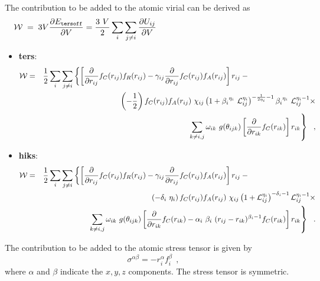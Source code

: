 The contribution to be added to the atomic virial can be derived
as
\begin{equation}
{\cal W} \; = \; 3V \frac{\partial E_{\tt tersoff}}{\partial V} =
\frac{3~V}{2} \sum_{i} \sum_{j \neq i} \frac{\partial U_{ij}}{\partial V} \phantom{xxxxxxxxxxxxxxxxxxxxxxxxxxxxx}
\end{equation}
\begin{itemize}
\item {\bf ters}:
\begin{eqnarray}
{\cal W} &=& \frac{1}{2} \sum_{i} \sum_{j \neq i} \left\{ \left[
\frac{\partial}{\partial r_{ij}} f_{C}(r_{ij}) f_{R}(r_{ij}) -
\gamma_{ij} \frac{\partial}{\partial r_{ij}} f_{C}(r_{ij}) f_{A}(r_{ij}) \right] r_{ij} - \phantom{xxxxxxxxxxxxxxx} \right. \nonumber \\
& & \phantom{xxxxxxxx} \left( -\frac{1}{2} \right) f_{C}(r_{ij}) f_{A}(r_{ij})~\chi_{ij}
\left( 1 + {\beta_{i}}^{\eta_{i}}~{\cal{L}}_{ij}^{\eta_{i}} \right)^{-\frac{1}{2 \eta_{i}} - 1}
{\beta_{i}}^{\eta_{i}}~{\cal{L}}_{ij}^{\eta_{i}-1} \times \\
& & \phantom{xxxxxxxx} \left. \sum_{k \neq i,j} \omega_{ik}~g(\theta_{ijk}) \left[
\frac{\partial}{\partial r_{ik}} f_{C}(r_{ik}) \right] r_{ik} \right\}~~,
\nonumber
\end{eqnarray}
\item {\bf hiks}:
\begin{eqnarray}
{\cal W} &=& \frac{1}{2} \sum_{i} \sum_{j \neq i} \left\{ \left[
\frac{\partial}{\partial r_{ij}} f_{C}(r_{ij}) f_{R}(r_{ij}) -
\gamma_{ij} \frac{\partial}{\partial r_{ij}} f_{C}(r_{ij}) f_{A}(r_{ij}) \right] r_{ij} - \phantom{xxxxxxxxxxxxxxx} \right. \nonumber \\
& & \phantom{xxxxxxxx} \left(-\delta_{i}~\eta_{i}\right) f_{C}(r_{ij}) f_{A}(r_{ij})~\chi_{ij}
\left( 1 + {\cal{L}}_{ij}^{\eta_{i}} \right)^{-\delta_{i} - 1} {\cal{L}}_{ij}^{\eta_{i}-1} \times \\
& & \phantom{xxxxxxxx} \left. \sum_{k \neq i,j} \omega_{ik}~g(\theta_{ijk}) \left[
\frac{\partial}{\partial r_{ik}} f_{C}(r_{ik})
- \alpha_{i}~\beta_{i}~(r_{ij}-r_{ik})^{\beta_{i}-1}f_{C}(r_{ik}) \right] r_{ik} \right\}~~.
\nonumber
\end{eqnarray}
\end{itemize}

The contribution to be added to the atomic stress
tensor is given by
\begin{equation}
\sigma^{\alpha \beta} = -r_{i}^{\alpha} f_{i}^{\beta}~~,
\end{equation}
where $\alpha$ and $\beta$ indicate the $x,y,z$ components.  The
stress tensor is symmetric.


